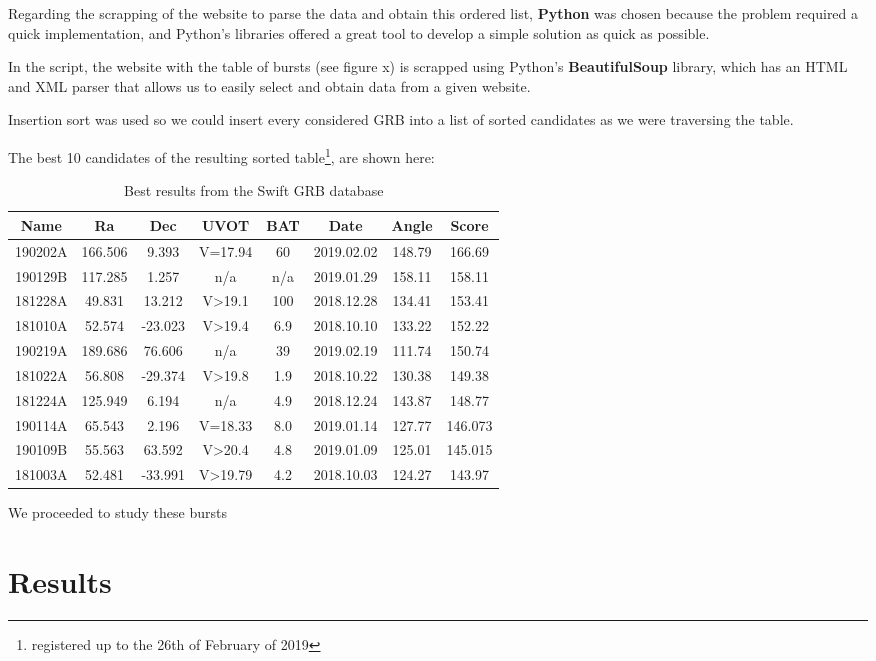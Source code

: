 Regarding the scrapping of the website to parse the data and obtain this ordered list, \textbf{Python} was chosen because the problem required a quick implementation, and Python’s libraries offered a great tool to develop a simple solution as quick as possible.

In the script, the website with the table of bursts (see figure x) is scrapped using Python’s \textbf{BeautifulSoup} library, which has an HTML and XML parser that allows us to easily select and obtain data from a given website.

Insertion sort was used so we could insert every considered GRB into a list of sorted candidates as we were traversing the table. 

The best 10 candidates of the resulting sorted table\footnote{registered up to the 26th of February of 2019}, are shown here:

\clearpage

\begin{table}[h!]
	\centering
	\def\arraystretch{1.2}
	\begin{tabular}{|c c c c c c c c|} 
		\hline
		Name & Ra & Dec & UVOT & BAT & Date & Angle & Score \\
		\hline\hline
		190202A & 166.506 & 9.393 & V=17.94 & 60 & 2019.02.02 & 148.79 & 166.69 \\
		\hline
		190129B & 117.285 & 1.257 & n/a & n/a & 2019.01.29 & 158.11 & 158.11 \\
		\hline
		181228A & 49.831 & 13.212 & V>19.1 & 100 & 2018.12.28 & 134.41 & 153.41 \\
		\hline
		181010A & 52.574 & -23.023 & V>19.4 & 6.9 & 2018.10.10 & 133.22 & 152.22 \\
		\hline
		190219A & 189.686 & 76.606 & n/a & 39 & 2019.02.19 & 111.74 & 150.74 \\
		\hline
		181022A & 56.808 & -29.374 & V>19.8 & 1.9 & 2018.10.22 & 130.38 & 149.38 \\
		\hline
		181224A & 125.949 & 6.194 & n/a & 4.9 & 2018.12.24 & 143.87 & 148.77 \\
		\hline
		190114A & 65.543 & 2.196 & V=18.33 & 8.0 & 2019.01.14 & 127.77 & 146.073 \\
		\hline
		190109B & 55.563 & 63.592 & V>20.4 & 4.8 & 2019.01.09 & 125.01 & 145.015 \\
		\hline
		181003A & 52.481 & -33.991 & V>19.79 & 4.2 & 2018.10.03 & 124.27 & 143.97 \\
		\hline
	\end{tabular}
	\caption{Best results from the Swift GRB database}
\end{table}

We proceeded to study these bursts

\section{Results}
